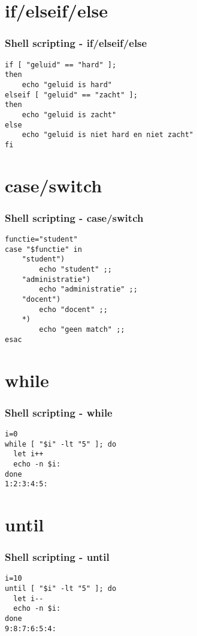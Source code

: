 \documentclass{beamer}
\begin{document}
\section{if/elseif/else}

\begin{frame}[fragile]
  \frametitle{Shell scripting - if/elseif/else}
  \begin{lstlisting}
if [ "geluid" == "hard" ];
then
    echo "geluid is hard"
elseif [ "geluid" == "zacht" ];
then
    echo "geluid is zacht"
else
    echo "geluid is niet hard en niet zacht"
fi
  \end{lstlisting}
\end{frame}

\section{case/switch}

\begin{frame}[fragile]
  \frametitle{Shell scripting - case/switch}
  \begin{lstlisting}
functie="student"
case "$functie" in
    "student")
        echo "student" ;;
    "administratie")
        echo "administratie" ;;
    "docent")
        echo "docent" ;;
    *)
        echo "geen match" ;;
esac
  \end{lstlisting}%
\end{frame}

\section{while}

\begin{frame}[fragile]
  \frametitle{Shell scripting - while}
  \begin{lstlisting}
i=0
while [ "$i" -lt "5" ]; do   
  let i++
  echo -n $i:
done
1:2:3:4:5:
  \end{lstlisting}
\end{frame}

\section{until}

\begin{frame}[fragile]
  \frametitle{Shell scripting - until}
  \begin{lstlisting}
i=10
until [ "$i" -lt "5" ]; do   
  let i--
  echo -n $i:
done
9:8:7:6:5:4:
  \end{lstlisting}
\end{frame}
\end{document}
